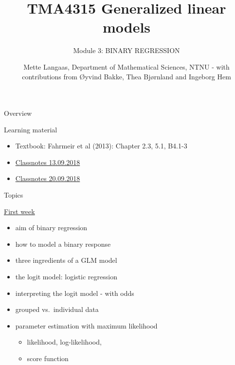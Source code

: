 \documentclass[
  ignorenonframetext,
]{beamer}
\title{TMA4315 Generalized linear models}
\subtitle{Module 3: BINARY REGRESSION}
\author{Mette Langaas, Department of Mathematical Sciences, NTNU - with
contributions from Øyvind Bakke, Thea Bjørnland and Ingeborg Hem}
\date{}
\providecommand{\tightlist}{%
  \setlength{\itemsep}{0pt}\setlength{\parskip}{0pt}}
\begin{document}
\frame{\titlepage}

\begin{frame}{Overview}
\label{overview}
\begin{block}{Learning material}
\label{learning-material}
\begin{itemize}
\tightlist
\item
  Textbook: Fahrmeir et al (2013): Chapter 2.3, 5.1, B4.1-3
\item
  \href{https://www.math.ntnu.no/emner/TMA4315/2018h/TMA4315M3H20180913.pdf}{Classnotes
  13.09.2018}
\item
  \href{https://www.math.ntnu.no/emner/TMA4315/2018h/TMA4315M3H20180920.pdf}{Classnotes
  20.09.2018}
\end{itemize}
\end{block}
\end{frame}

\begin{frame}
\begin{block}{Topics}
\label{topics}
\begin{block}{\hyperlink{firstweek}{First week}}
\label{first-week}
\begin{itemize}
\tightlist
\item
  aim of binary regression
\item
  how to model a binary response
\item
  three ingredients of a GLM model
\item
  the logit model: logistic regression
\item
  interpreting the logit model - with odds
\item
  grouped vs.~individual data
\item
  parameter estimation with maximum likelihood

  \begin{itemize}
  \tightlist
  \item
    likelihood, log-likelihood,
  \item
    score function
  \end{itemize}
\end{itemize}
\end{block}
\end{block}
\end{frame}
\end{document}
